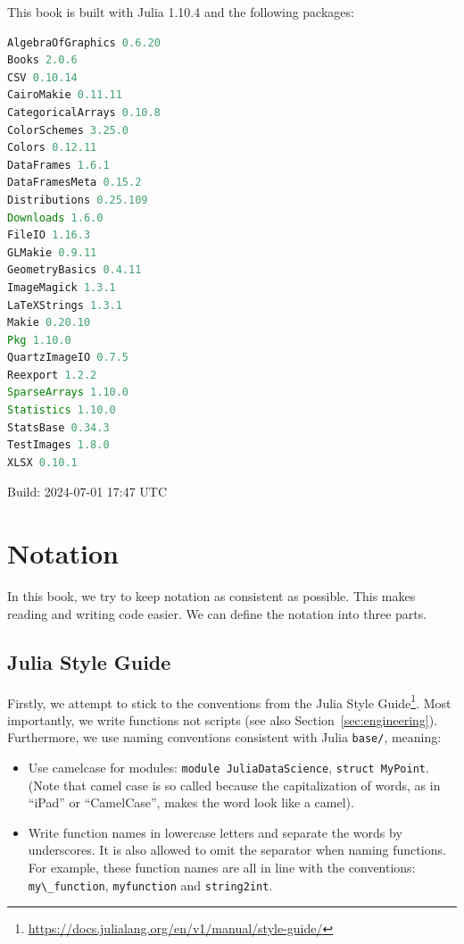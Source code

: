 \documentclass[
  notoc %
]{tufte-book}
\DeclareRobustCommand{\href}[2]{#2\footnote{\url{#1}}}
\providecommand{\tightlist}{%
  \setlength{\itemsep}{0pt}\setlength{\parskip}{0pt}
}
\newcommand{\passthrough}[1]{#1}
\begin{document}
This book is built with Julia 1.10.4 and the following packages:

\begin{lstlisting}[language=Julia]
AlgebraOfGraphics 0.6.20
Books 2.0.6
CSV 0.10.14
CairoMakie 0.11.11
CategoricalArrays 0.10.8
ColorSchemes 3.25.0
Colors 0.12.11
DataFrames 1.6.1
DataFramesMeta 0.15.2
Distributions 0.25.109
Downloads 1.6.0
FileIO 1.16.3
GLMakie 0.9.11
GeometryBasics 0.4.11
ImageMagick 1.3.1
LaTeXStrings 1.3.1
Makie 0.20.10
Pkg 1.10.0
QuartzImageIO 0.7.5
Reexport 1.2.2
SparseArrays 1.10.0
Statistics 1.10.0
StatsBase 0.34.3
TestImages 1.8.0
XLSX 0.10.1
\end{lstlisting}

Build: 2024-07-01 17:47 UTC

\hypertarget{sec:notation}{%
\section{Notation}\label{sec:notation}}

In this book, we try to keep notation as consistent as possible. This
makes reading and writing code easier. We can define the notation into
three parts.

\hypertarget{julia-style-guide}{%
\subsection{Julia Style Guide}\label{julia-style-guide}}

Firstly, we attempt to stick to the conventions from the
\href{https://docs.julialang.org/en/v1/manual/style-guide/}{Julia Style
Guide}. Most importantly, we write functions not scripts (see also
Section~\ref{sec:engineering}). Furthermore, we use naming conventions
consistent with Julia \passthrough{\lstinline!base/!}, meaning:

\begin{itemize}
\tightlist
\item
  Use camelcase for modules:
  \passthrough{\lstinline!module JuliaDataScience!},
  \passthrough{\lstinline!struct MyPoint!}. (Note that camel case is so
  called because the capitalization of words, as in ``iPad'' or
  ``CamelCase'', makes the word look like a camel).
\item
  Write function names in lowercase letters and separate the words by
  underscores. It is also allowed to omit the separator when naming
  functions. For example, these function names are all in line with the
  conventions: \passthrough{\lstinline!my\_function!},
  \passthrough{\lstinline!myfunction!} and
  \passthrough{\lstinline!string2int!}.
\end{itemize}
\end{document}
